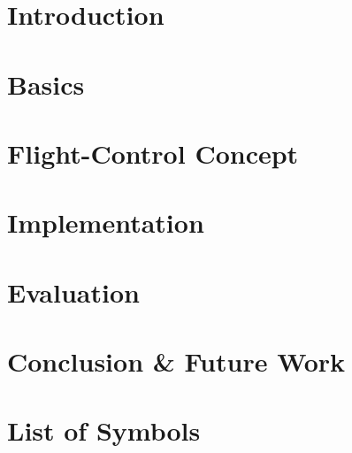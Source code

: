 \documentclass[bachelor,english]{infothesis}
\begin{document}




\setcounter{page}{1}
\chapter{Introduction}
	

\chapter{Basics}
	

%	
	
\chapter{Flight-Control Concept}
	

\chapter{Implementation}
	

%	

\chapter{Evaluation}
	

\chapter{Conclusion \& Future Work}
	

	

\chapter*{List of Symbols}
\end{document}
